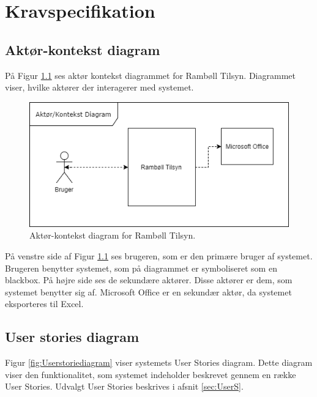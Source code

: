 	\chapter{Kravspecifikation}
	
	\section{Aktør-kontekst diagram}
		På Figur \ref{fig:AktorKontekst} ses aktør kontekst diagrammet for Rambøll Tilsyn. Diagrammet viser, hvilke aktører der interagerer med systemet.
	\begin{figure}[H]
		\centering
		\includegraphics[width=0.6\linewidth]{Kravspecifikation/AktorDiagram}
		\caption{Aktør-kontekst diagram for Rambøll Tilsyn.}
		\label{fig:AktorKontekst}
	\end{figure}

	På venstre side af Figur \ref{fig:AktorKontekst} ses brugeren, som er den primære bruger af systemet. Brugeren benytter systemet, som på diagrammet er symboliseret som en blackbox. På højre side ses de sekundære aktører. Disse aktører er dem, som systemet benytter sig af. Microsoft Office er en sekundær aktør, da systemet eksporteres til Excel.
	
	\clearpage
	
\section{User stories diagram}
	Figur \ref{fig:Userstoriediagram} viser systemets User Stories diagram. Dette diagram viser den funktionalitet, som systemet indeholder beskrevet gennem en række User Stories. Udvalgt User Stories beskrives i afsnit \ref{sec:UserS}.
	
